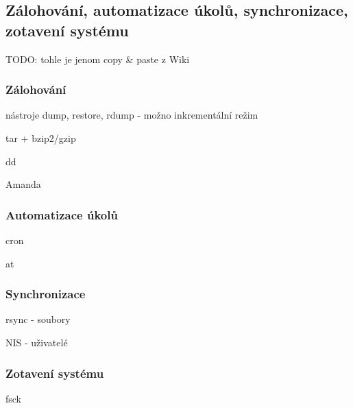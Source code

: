 \subsection{Zálohování, automatizace úkolů, synchronizace, zotavení systému}

TODO: tohle je jenom copy \& paste z Wiki

\subsubsection*{Zálohování}

\begin{pitemize}
    \item nástroje dump, restore, rdump - možno inkrementální režim
    \item tar + bzip2/gzip
    \item dd
    \item Amanda 
\end{pitemize}

\subsubsection*{Automatizace úkolů}

\begin{pitemize}
    \item cron
    \item at 
\end{pitemize}

\subsubsection*{Synchronizace}

\begin{pitemize}
    \item rsync - soubory
    \item NIS - uživatelé 
\end{pitemize}

\subsubsection*{Zotavení systému}

\begin{pitemize}
    \item fsck 
\end{pitemize}
